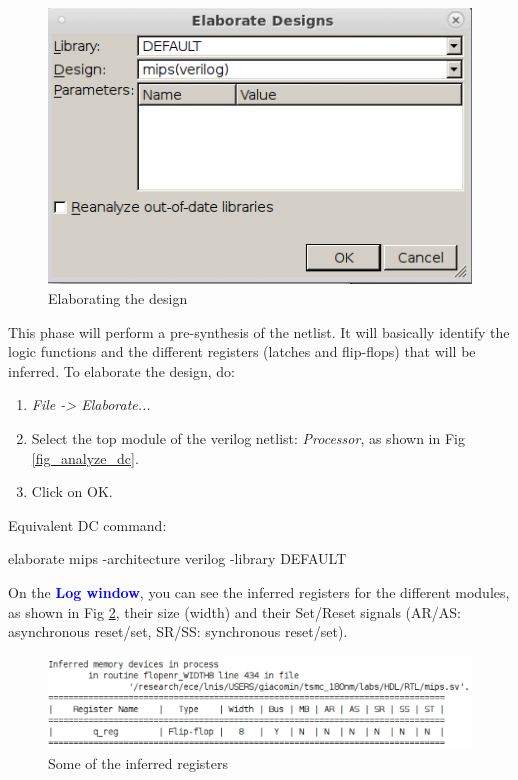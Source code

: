 	\parbox[t]{\dimexpr\textwidth-\leftmargin}{%
	\begin{figure}
		\vspace{-6mm}
		\centering
		\vspace{-\baselineskip}
		\includegraphics[scale=0.45]{figures/lab3_design_compiler/elaborate_dc}
\caption{Elaborating the design}
\label{fig_elaborate_dc}
	\end{figure}
This phase will perform a pre-synthesis of the netlist. It will basically identify the logic functions and the different registers (latches and flip-flops) that will be inferred. To elaborate the design, do:

\begin{enumerate}
	\item \textit {File -> Elaborate...}
	\item Select the top module of the verilog netlist: \textit{Processor}, as shown in Fig \ref{fig_analyze_dc}. 
	\item Click on OK.	
\end{enumerate}
}




Equivalent DC command:
	\begin{codeline}
elaborate mips -architecture verilog -library DEFAULT
\end{codeline}


On the \textbf{\textcolor{blue}{Log window}}, you can see the inferred registers for the different modules, as shown in Fig \ref{fig_registers}, their size (width) and their Set/Reset signals (AR/AS: asynchronous reset/set, SR/SS: synchronous reset/set). 

	\begin{figure}[!h]
	\centering
	\includegraphics[scale=0.5]{figures/lab3_design_compiler/registers}
	\caption{Some of the inferred registers}
	\label{fig_registers}
\end{figure}

